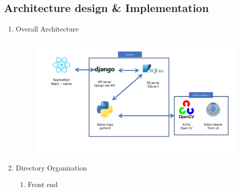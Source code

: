 \documentclass[conference]{IEEEtran}
\begin{document}
\begin{enumerate}[label=\arabic*.]
\section{\Large{Architecture design \& Implementation}}
\begin{enumerate}[label=\arabic*.]
    \item {\large{Overall Architecture}} \\
    \begin{figure}[H]\centering \includegraphics[scale=0.3]{images/overall_diagram.jpg}\end{figure} 
    \item {\large{Directory Organization}} \\
    \begin{enumerate}[label=\alph*.]
        \item {\large{Front end}}\\
        

\end{enumerate}
\end{enumerate}
\end{enumerate}
\end{document}
